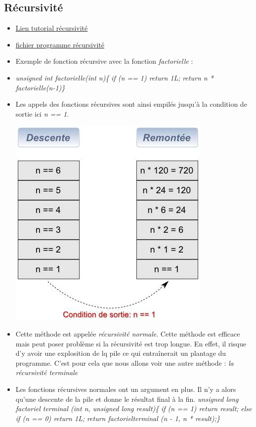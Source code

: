 \documentclass[12pt,a4paper]{article}
\begin{document}
\subsection{Récursivité}
\begin{itemize}
\item \href{https://franckh.developpez.com/tutoriels/c-ansi/recursivite/}{Lien tutorial récursivité}
\item \href{run:../Test C/}{fichier programme récursivité}
\item Exemple de fonction récursive avec la fonction \textit{factorielle} :
\item \textit{unsigned int factorielle(int n)\{ }
\newline \textit{if (n == 1) return 1L;}
\newline \textit{return n * factorielle(n-1)\}}
\item Les appels des fonctions récursives sont ainsi empilés jusqu'à la condition de sortie ici \textit{n == 1}.
\begin{center}
\includegraphics[scale=0.5]{piles_de_recursivite}
\end{center}
\item Cette méthode est appelée \textit{récursivité normale}. Cette méthode est efficace mais peut poser problème si la récursivité est trop longue. En effet, il risque d'y avoir une explosition de lq pile ce qui entraînerait un plantage du programme. C'est pour cela que nous allons voir une autre méthode : \textit{la récursivité terminale}
\item Les fonctions récursives normales ont un argument en plus. Il n'y a alors qu'une descente de la pile et donne le résultat final à la fin.
\newline \textit{unsigned long factoriel \textunderscore terminal (int n, unsigned long result)\{}
\newline \textit{   if (n == 1) return result;}
\newline \textit{   else if (n == 0) return 1L;}
\newline \textit{   return factoriel\textunderscore terminal (n - 1, n * result);\}}

\end{itemize}
\end{document}
